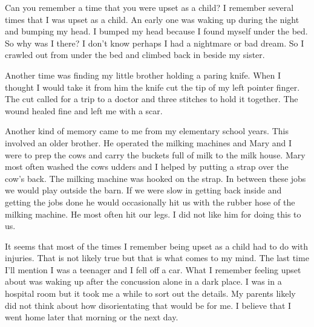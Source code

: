 Can you remember a time that you were upset as a child?
I remember several times that I was upset as a child.
An early one was waking up during the night and bumping my head.
I bumped my head because I found myself under the bed.
So why was I there? I don't know perhaps I had a nightmare or bad dream.
So I crawled out from under the bed and climbed back in beside my sister.

Another time was finding my little brother holding a paring knife.
When I thought I would take it from him the knife cut the tip of my left pointer finger.
The cut called for a trip to a doctor and three stitches to hold it together.
The wound healed fine and left me with a scar.

Another kind of memory came to me from my elementary school years.
This involved an older brother.
He operated the milking machines and Mary and I were to prep the cows and carry the buckets full of milk to the milk house.
Mary most often washed the cows udders and I helped by putting a strap over the cow's back.
The milking machine was hooked on the strap.
In between these jobs we would play outside the barn.
If we were slow in getting back inside and getting the jobs done he would occasionally hit us with the rubber hose of the milking machine.
He most often hit our legs.
I did not like him for doing this to us.

It seems that most of the times I remember being upset as a child had to do with injuries.
That is not likely true but that is what comes to my mind.
The last time I'll mention I was a teenager and I fell off a car.
What I remember feeling upset about was waking up after the concussion alone in a dark place.
I was in a hospital room but it took me a while to sort out the details.
My parents likely did not think about how disorientating that would be for me.
I believe that I went home later that morning or the next day.







